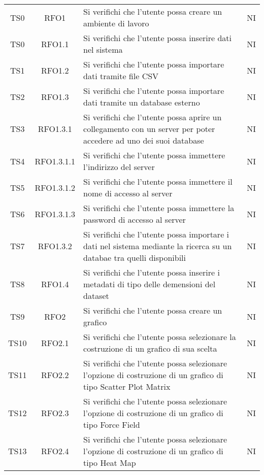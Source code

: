 \documentclass[../piano_di_qualifica.tex]{subfiles}
\begin{document}
\begin{center}
\begin{longtable}{|c|c|p{8cm}|c|}
		\endlastfoot
		TS0               & RFO1                   & Si verifichi che l'utente possa creare un ambiente di lavoro     & NI                         \\
		TS0               & RFO1.1                   & Si verifichi che l'utente possa inserire dati nel sistema & NI                         \\
		TS1               & RFO1.2              & Si verifichi che l'utente possa importare dati tramite file CSV         & NI                         \\
		TS2               & RFO1.3            & Si verifichi che l'utente possa importare dati tramite un database esterno   & NI                  \\
		TS3               & RFO1.3.1      & Si verifichi che l'utente possa aprire un collegamento con un server per poter accedere ad uno dei suoi database & NI                         \\
		TS4               & RFO1.3.1.1                   & Si verifichi che l'utente possa immettere l'indirizzo del server & NI                         \\
		TS5               & RFO1.3.1.2                   & Si verifichi che l'utente possa immettere il nome di accesso al server & NI                         \\
		TS6               & RFO1.3.1.3      & Si verifichi che l'utente possa immettere la password di accesso al server & NI  \\
		TS7               & RFO1.3.2      & Si verifichi che l'utente possa importare i dati nel sistema mediante la ricerca su un databae tra quelli disponibili & NI  \\
		TS8               & RFO1.4      & Si verifichi che l'utente possa inserire i metadati di tipo delle demensioni del dataset & NI  \\
		TS9               & RFO2      & Si verifichi che l'utente possa creare  un grafico & NI  \\
		TS10               & RFO2.1      & Si verifichi che l'utente possa selezionare la costruzione di un grafico di sua scelta & NI  \\
		TS11               & RFO2.2      & Si verifichi che l'utente possa selezionare l'opzione di costruzione di un grafico di tipo Scatter Plot Matrix & NI  \\
		TS12               & RFO2.3     & Si verifichi che l'utente possa selezionare l'opzione di costruzione di un grafico di tipo Force Field & NI  \\
		TS13               & RFO2.4     & Si verifichi che l'utente possa selezionare l'opzione di costruzione di un grafico di tipo Heat Map & NI  \\

\end{longtable}
\end{center}
\end{document}
